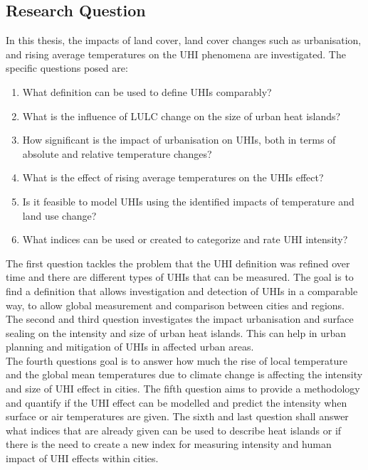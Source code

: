 \documentclass[12pt,a4paper, english,twoside]{article}
\begin{document}
 \subsection{Research Question}

  In this thesis, the impacts of land cover, land cover changes such as urbanisation, and rising average temperatures on the \gls{UHI} phenomena are investigated.
  The specific questions posed are:
  \begin{enumerate}
    \item What definition can be used to define \glspl{UHI} comparably?\label{q1}
    \item What is the influence of \gls{LULC} change on the size of urban heat islands?\label{q2}
    \item How significant is the impact of urbanisation on \glspl{UHI}, both in terms of absolute and relative temperature changes?\label{q3}
    \item What is the effect of rising average temperatures on the \glspl{UHI} effect?\label{q4}
    \item Is it feasible to model \glspl{UHI} using the identified impacts of temperature and land use change?\label{q5}
    \item What indices can be used or created to categorize and rate \gls{UHI} intensity?\label{q6}
  \end{enumerate}
  The first question tackles the problem that the \gls{UHI} definition was refined over time and there are different types of \glspl{UHI} that can be measured. 
  The goal is to find a definition that allows investigation and detection of \glspl{UHI} in a comparable way, to allow global measurement and comparison between cities and regions.\\ 
  The second and third question investigates the impact urbanisation and surface sealing on the intensity and size of urban heat islands. 
  This can help in urban planning and mitigation of \glspl{UHI} in affected urban areas.\\ %
  The fourth questions goal is to answer how much the rise of local temperature and the global mean temperatures due to climate change is affecting the intensity and size of \gls{UHI} effect in cities.%
  The fifth question aims to provide a methodology and quantify if the \gls{UHI} effect can be modelled and predict the intensity when surface or air temperatures are given. 
  The sixth and last question shall answer what indices that are already given can be used to describe heat islands or if there is the need to create a new index for measuring intensity and human impact of \gls{UHI} effects within cities.
\end{document}
